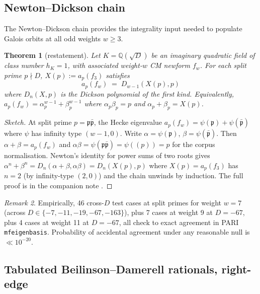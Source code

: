 \documentclass[11pt]{amsart}
\newtheorem{theorem}{Theorem}
\theoremstyle{definition}
\theoremstyle{remark}
\newtheorem{remark}[theorem]{Remark}
\newcommand{\Q}{\mathbb{Q}}
\newcommand{\fr}[1]{\mathfrak{#1}}
\begin{document}
\subsection{Newton--Dickson chain}\label{ss:newton-dickson}

The Newton--Dickson chain provides the integrality input needed to
populate Galois orbits at all odd weights $w \ge 3$.

\begin{theorem}[restatement]\label{thm:newton-dickson-restate}
Let $K = \Q(\sqrt{D})$ be an imaginary quadratic field of class number
$h_K = 1$, with associated weight-$w$ CM newform $f_w$. For each split
prime $p \nmid D$, $X(p) := a_p(f_3)$ satisfies
\[
a_p(f_w) \;=\; D_{w-1}(X(p), p)
\]
where $D_n(X, p)$ is the Dickson polynomial of the first kind.
Equivalently, $a_p(f_w) = \alpha_p^{w-1} + \beta_p^{w-1}$ where
$\alpha_p \beta_p = p$ and $\alpha_p + \beta_p = X(p)$.
\end{theorem}

\begin{proof}[Sketch]
At split prime $p = \fr p \bar{\fr p}$, the Hecke eigenvalue
$a_p(f_w) = \psi(\fr p) + \psi(\bar{\fr p})$ where $\psi$ has infinity
type $(w-1, 0)$. Write $\alpha = \psi(\fr p)$, $\beta = \psi(\bar{\fr p})$.
Then $\alpha + \beta = a_p(f_w)$ and $\alpha \beta = \psi(\fr p \bar{\fr p})
= \psi((p)) = p$ for the corpus normalisation. Newton's identity for
power sums of two roots gives $\alpha^n + \beta^n = D_n(\alpha + \beta,
\alpha \beta) = D_n(X(p), p)$ where $X(p) = a_p(f_3)$ has $n = 2$
(by infinity-type $(2,0)$) and the chain unwinds by induction.
The full proof is in the companion note \cite{OPNewtonDickson2026}.
\end{proof}

\begin{remark}\label{rk:newton-empirical-pile}
Empirically, 46 cross-$D$ test cases at split primes for weight $w = 7$
(across $D \in \{-7, -11, -19, -67, -163\}$), plus 7 cases at weight 9
at $D = -67$, plus 4 cases at weight 11 at $D = -67$, all check to
exact agreement in PARI \texttt{mfeigenbasis}. Probability of accidental
agreement under any reasonable null is $\ll 10^{-20}$.
\end{remark}

\subsection{Tabulated Beilinson--Damerell rationals, right-edge}\label{ss:tabulated}
\end{document}
